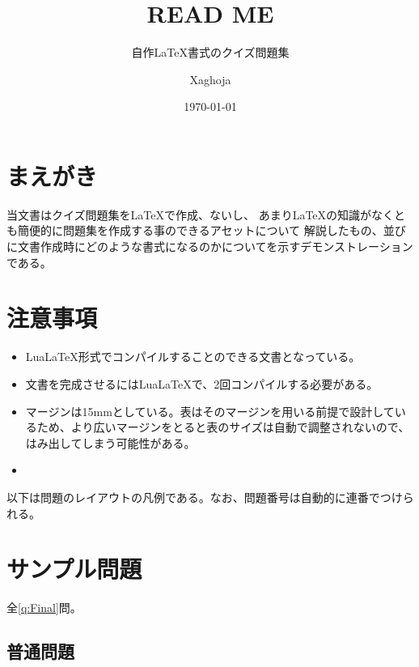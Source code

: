 \documentclass[titlepage,10pt,a4j]{ltjsarticle} %
\title{READ ME}
\subtitle{自作\LaTeX 書式のクイズ問題集}
\author{Xaghoja}
\date{\today}
\begin{document}
\maketitle
\clearpage

\tableofcontents
\clearpage

\section{まえがき}
当文書はクイズ問題集を\LaTeX で作成、ないし、
あまり\LaTeX の知識がなくとも簡便的に問題集を作成する事のできるアセットについて
解説したもの、並びに文書作成時にどのような書式になるのかについてを示すデモンストレーションである。

\section{注意事項}
\begin{itemize}
    \item Lua\LaTeX 形式でコンパイルすることのできる文書となっている。
    \item 文書を完成させるにはLua\LaTeX で、2回コンパイルする必要がある。
    \item マージンは15mmとしている。表はそのマージンを用いる前提で設計しているため、より広いマージンをとると表のサイズは自動で調整されないので、はみ出してしまう可能性がある。
    \item 
\end{itemize}

以下は問題のレイアウトの凡例である。なお、問題番号は自動的に連番でつけられる。

\clearpage %
\section{サンプル問題}
全\ref{q:Final}問。

    \subsection{普通問題}
    \label{nomal}
\end{document}
